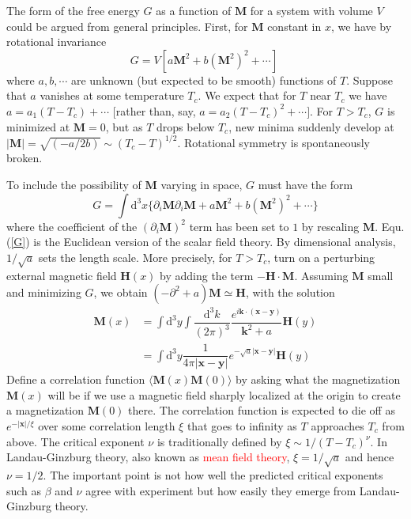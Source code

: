 \documentclass[11pt,a4paper]{article}
\renewcommand{\vec}[1]{\boldsymbol{#1}}
\newcommand{\dif}{\mathrm{d}}
\newcounter{theo}[section]\setcounter{theo}{0}
\begin{document}
The form of the free energy $G$ as a function of $\vec{M}$ for a system with volume $V$ could be argued from general principles. First, for $\vec{M}$ constant in $x$, we have by rotational invariance
\begin{equation}
G = V [a \vec{M}^2 + b (\vec{M}^2)^2 +\cdots] ~
\end{equation}
where $a, b, \cdots$ are unknown (but expected to be smooth) functions of $T$. Suppose that $a$ vanishes at some temperature $T_c$. We expect that for $T$ near $T_c$ we have $a = a_1(T - T_c) + \cdots$ [rather than, say, $a = a_2(T - T_c)^2 + \cdots]$. For $T > T_c$, $G$ is minimized at $\vec{M} = 0$, but as $T$ drops below $T_c$, new minima suddenly develop at $|\vec{M}| = \sqrt{(-a/2b)} \sim (T_c - T)^{1/2}$. Rotational symmetry is spontaneously broken.

To include the possibility of $\vec{M}$ varying in space, $G$ must have the form
\begin{equation}
G = \int \dif^3 x \{\partial_i \vec{M} \partial_i \vec{M} + a\vec{M}^2 +b(\vec{M}^2)^2 +\cdots \}
\label{G}
\end{equation}
where the coefficient of the $(\partial_i \vec{M})^2$ term has been set to $1$ by rescaling $\vec{M}$. Equ. (\ref{G}) is the Euclidean version of the scalar field theory. By dimensional analysis, $1/\sqrt{a}$ sets the length scale. More precisely, for $T > T_c$, turn on a perturbing external magnetic field $\vec{H}(x)$ by adding the term $-\vec{H}\cdot \vec{M}$. Assuming $\vec{M}$ small and minimizing $G$, we obtain $(-\partial^2 + a) \vec{M} \simeq \vec{H}$, with the solution
\begin{align}
\nonumber \vec{M}(x) &= \int \dif^3 y \int \dfrac{\dif^3 k}{(2\pi)^3} \dfrac{e^{i\vec{k}\cdot (\vec{x}-\vec{y})}}{\vec{k}^2 +a} \vec{H}(y) \\
&= \int \dif^3 y \dfrac{1}{4\pi |\vec{x} -\vec{y}|} e^{-\sqrt{a} |\vec{x} -\vec{y}|} \vec{H}(y) 
\end{align}
Define a correlation function $\langle \vec{M}(x) \vec{M}(0)\rangle$ by asking what the magnetization $ \vec{M}(x)$ will be if we use a magnetic field sharply localized at the origin to create a magnetization $ \vec{M}(0)$ there. The correlation function is expected to die off as $e^{-|\vec{x}|/\xi}$ over some correlation length $\xi$ that goes to infinity as $T$ approaches $T_c$ from above. The critical exponent $\nu$ is traditionally defined by $\xi \sim 1/(T - T_c)^\nu$. In Landau-Ginzburg theory, also known as \textcolor{red}{mean field theory}, $\xi = 1/\sqrt{a}$ and hence $\nu = 1/2$. The important point is not how well the predicted critical exponents such as $\beta$ and $\nu$ agree with experiment but how easily they emerge from Landau-Ginzburg theory. 
\end{document}
